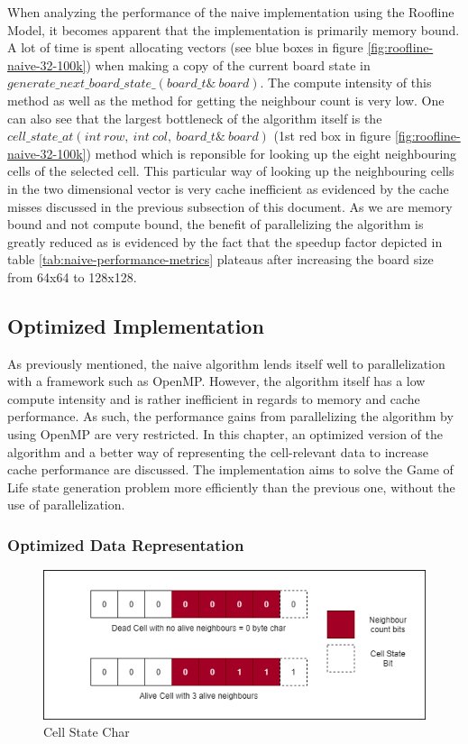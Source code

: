 \documentclass[a4paper,english,12pt,twoside=false]{scrartcl} %
\begin{document}
When analyzing the performance of the naive implementation using the Roofline Model, it becomes apparent that the implementation is primarily memory bound. A lot of time is spent allocating vectors (see blue boxes in figure \ref{fig:roofline-naive-32-100k}) when making a copy of the current board state in $generate{\_}next{\_}board{\_}state{\_}(board{\_}t{\&}{\ }board)$. The compute intensity of this method as well as the method for getting the neighbour count is very low. One can also see that the largest bottleneck of the algorithm itself is the $cell{\_}state{\_}at(int{\ }row,{\ }int{\ }col,{\ }board{\_}t{\&}{\ } board)$ (1st red box in figure \ref{fig:roofline-naive-32-100k}) method which is reponsible for looking up the eight neighbouring cells of the selected cell. This particular way of looking up the neighbouring cells in the two dimensional vector is very cache inefficient as evidenced by the cache misses discussed in the previous subsection of this document. As we are memory bound and not compute bound, the benefit of parallelizing the algorithm is greatly reduced as is evidenced by the fact that the speedup factor depicted in table \ref{tab:naive-performance-metrics} plateaus after increasing the board size from 64x64 to 128x128. 

\subsection{Optimized Implementation}

As previously mentioned, the naive algorithm lends itself well to parallelization with a framework such as OpenMP. However, the algorithm itself has a low compute intensity and is rather inefficient in regards to memory and cache performance. As such, the performance gains from parallelizing the algorithm by using OpenMP are very restricted. In this chapter, an optimized version of the algorithm and a better way of representing the cell-relevant data to increase cache performance are discussed. The implementation aims to solve the Game of Life state generation problem more efficiently than the previous one, without the use of parallelization.

\subsubsection{Optimized Data Representation}

\begin{figure}[tbh!]
	\centering
	\includegraphics[width=16cm]{imgs/cell-state.png}
	\caption{Cell State Char}
	\label{fig:cell-state}
\end{figure}
\end{document}
